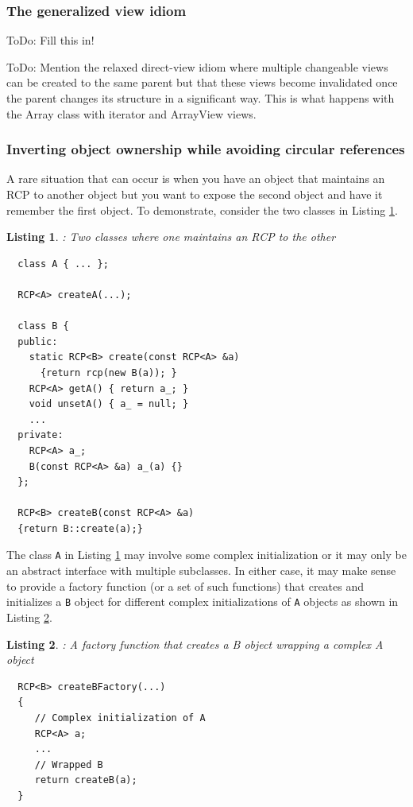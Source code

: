 \documentclass[pdf,ps2pdf,11pt]{SANDreport}
\newtheorem{listing}{Listing}
\begin{document}
%
{}\subsubsection{The generalized view idiom}
%

ToDo: Fill this in!

ToDo: Mention the relaxed direct-view idiom where multiple changeable
views can be created to the same parent but that these views become
invalidated once the parent changes its structure in a significant
way.  This is what happens with the Array class with iterator and
ArrayView views.


%
{}\subsubsection{Inverting object ownership while avoiding circular references}
\label{sec:inverting-obj-ownership}
%

A rare situation that can occur is when you have an object that
maintains an RCP to another object but you want to expose the second
object and have it remember the first object.  To demonstrate,
consider the two classes in Listing {}\ref{listing:B_owns_A_decl}.

\begin{listing}: Two classes where one maintains an RCP to the other \\
\label{listing:B_owns_A_decl}
{\small\begin{verbatim}
  class A { ... };

  RCP<A> createA(...);

  class B {
  public:
    static RCP<B> create(const RCP<A> &a)
      {return rcp(new B(a)); }
    RCP<A> getA() { return a_; }
    void unsetA() { a_ = null; }
    ...
  private:
    RCP<A> a_;
    B(const RCP<A> &a) a_(a) {}
  };

  RCP<B> createB(const RCP<A> &a)
  {return B::create(a);}
\end{verbatim}}
\end{listing}

The class {}\texttt{A} in Listing {}\ref{listing:B_owns_A_decl} may
involve some complex initialization or it may only be an abstract
interface with multiple subclasses.  In either case, it may make sense
to provide a factory function (or a set of such functions) that
creates and initializes a {}\texttt{B} object for different complex
initializations of {}\texttt{A} objects as shown in Listing
{}\ref{listing:createBFactory}.

\begin{listing}: A factory function that creates a B object wrapping a complex A object \\
\label{listing:createBFactory}
{\small\begin{verbatim}
  RCP<B> createBFactory(...)
  {
     // Complex initialization of A
     RCP<A> a;
     ...
     // Wrapped B
     return createB(a);
  }
\end{verbatim}}
\end{listing}
\end{document}
